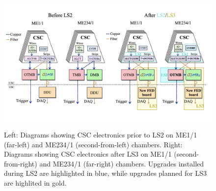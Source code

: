 \begin{figure}[H]
    \centering
    {\includegraphics[width=1\textwidth]{Images/Phase2Upgrades/Electronics/CSCLS2Upgrades.png}}
    \caption{Left: Diagrams showing CSC electronics prior to LS2 on ME1/1 (far-left) and ME234/1 (second-from-left) chambers. Right: Diagrams showing CSC electronics after LS3 on ME1/1 (second-from-right) and ME234/1 (far-right) chambers. Upgrades installed during LS2 are highlighted in blue, while upgrades planned for LS3 are highlited in gold.}
    \label{fig:CSCdiagram}
\end{figure}